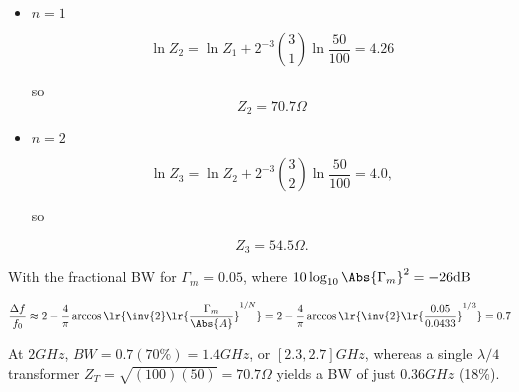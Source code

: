 {\begin{itemize}
so
\begin{equation}\label{eqn:uwavesDeck7MultisectionTransformersCore:520}
Z_1 = 91.7 \Omega
\end{equation}

\item \( n = 1 \)

\begin{dmath}\label{eqn:uwavesDeck7MultisectionTransformersCore:540}
\ln Z_{2}
= \ln Z_1 + 2^{-3} \binom{3}{1} \ln \frac{50}{100} = 4.26
\end{dmath}

so
\begin{dmath}\label{eqn:uwavesDeck7MultisectionTransformersCore:560}
Z_2 = 70.7 \Omega
\end{dmath}

\item \( n = 2 \)

\begin{dmath}\label{eqn:uwavesDeck7MultisectionTransformersCore:580}
\ln Z_{3} = \ln Z_2 + 2^{-3} \binom{3}{2} \ln \frac{50}{100} = 4.0,
\end{dmath}

so

\begin{dmath}\label{eqn:uwavesDeck7MultisectionTransformersCore:600}
Z_3 = 54.5 \Omega.
\end{dmath}

\end{itemize}


With the fractional BW for \( \Gamma_m = 0.05 \), where \( 10 \log_{10} \Abs{\Gamma_m}^2 = -26 \si{dB} \)

\begin{dmath}\label{eqn:uwavesDeck7MultisectionTransformersCore:920}
\frac{\Delta f}{f_0}
\approx
2 - \frac{4}{\pi} \arccos\lr{ \inv{2} \lr{ \frac{\Gamma_m}{\Abs{A}} }^{1/N} }
=
2 - \frac{4}{\pi} \arccos\lr{ \inv{2} \lr{ \frac{0.05}{0.0433} }^{1/3} }
= 0.7
\end{dmath}

At \( 2 \si{GHz} \), \( BW = 0.7 (70\%) = 1.4 \si{GHz} \), or \( [2.3,2.7] \si{GHz} \), whereas a single \( \lambda/4 \) transformer \( Z_T = \sqrt{ (100)(50) } = 70.7 \Omega \) yields a BW of just \( 0.36 \si{GHz} \) (18\%).

} %
